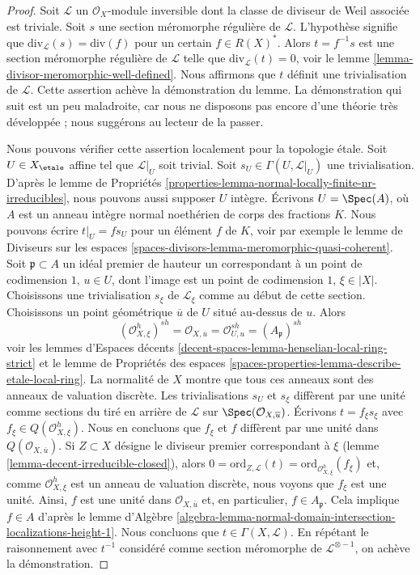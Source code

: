 \begin{proof}
Soit $\mathcal{L}$ un $\mathcal{O}_X$-module inversible dont la
classe de diviseur de Weil associée est triviale. Soit $s$ une section
méromorphe régulière de $\mathcal{L}$. L'hypothèse signifie que
$\text{div}_\mathcal{L}(s) = \text{div}(f)$ pour un certain
$f \in R(X)^*$. Alors $t = f^{-1}s$ est une section
méromorphe régulière de $\mathcal{L}$ telle que
$\text{div}_\mathcal{L}(t) = 0$, voir le
lemme \ref{lemma-divisor-meromorphic-well-defined}.
Nous affirmons que $t$ définit une trivialisation de $\mathcal{L}$.
Cette assertion achève la démonstration du lemme.
La démonstration qui suit est un peu maladroite, car nous ne
disposons pas encore d'une théorie très développée ; nous suggérons
au lecteur de la passer.

\medskip\noindent
Nous pouvons vérifier cette assertion localement pour la topologie \'etale. Soit
$U \in X_\etale$ affine tel que $\mathcal{L}|_U$ soit trivial. Soit
$s_U \in \Gamma(U, \mathcal{L}|_U)$ une trivialisation. D'après le
lemme de Propriétés \ref{properties-lemma-normal-locally-finite-nr-irreducibles},
nous pouvons aussi supposer $U$ intègre. Écrivons $U = \Spec(A)$, où $A$ est
un anneau intègre normal noethérien de corps des fractions $K$.
Nous pouvons écrire $t|_U = f s_U$ pour un élément $f$ de $K$, voir par exemple le
lemme de Diviseurs sur les espaces \ref{spaces-divisors-lemma-meromorphic-quasi-coherent}.
Soit $\mathfrak p \subset A$ un idéal premier de hauteur un
correspondant à un point de codimension $1$, $u \in U$, dont l'image
est un point de codimension $1$, $\xi \in |X|$. Choisissons une trivialisation
$s_\xi$ de $\mathcal{L}_\xi$ comme au début de cette section.
Choisissons un point géométrique $\overline{u}$ de $U$ situé au-dessus de $u$.
Alors
$$
(\mathcal{O}_{X, \xi}^h)^{sh} =
\mathcal{O}_{X, \overline{u}} =
\mathcal{O}_{U, u}^{sh} = (A_\mathfrak p)^{sh}
$$
voir les lemmes d'Espaces décents
\ref{decent-spaces-lemma-henselian-local-ring-strict}
et le lemme de
Propriétés des espaces
\ref{spaces-properties-lemma-describe-etale-local-ring}.
La normalité de $X$ montre que tous ces anneaux sont des
anneaux de valuation discrète. Les trivialisations $s_U$ et $s_\xi$
diffèrent par une unité comme sections du tiré en arrière de $\mathcal{L}$ sur
$\Spec(\mathcal{O}_{X, \overline{u}})$.
Écrivons $t = f_\xi s_\xi$ avec $f_\xi \in Q(\mathcal{O}_{X, \xi}^h)$.
Nous en concluons que $f_\xi$ et $f$ diffèrent par une unité
dans $Q(\mathcal{O}_{X, \overline{u}})$.
Si $Z \subset X$ désigne le diviseur premier correspondant à $\xi$
(lemme \ref{lemma-decent-irreducible-closed}), alors
$0 = \text{ord}_{Z, \mathcal{L}}(t) =
\text{ord}_{\mathcal{O}_{X, \xi}^h}(f_\xi)$
et, comme $\mathcal{O}_{X, \xi}^h$ est un anneau de valuation discrète,
nous voyons que $f_\xi$ est une unité.
Ainsi, $f$ est une unité dans $\mathcal{O}_{X, \overline{u}}$
et, en particulier, $f \in A_\mathfrak p$.
Cela implique $f \in A$ d'après le lemme d'Algèbre
\ref{algebra-lemma-normal-domain-intersection-localizations-height-1}.
Nous concluons que $t \in \Gamma(X, \mathcal{L})$.
En répétant le raisonnement avec $t^{-1}$ considéré comme section méromorphe
de $\mathcal{L}^{\otimes -1}$, on achève la démonstration.
\end{proof}
